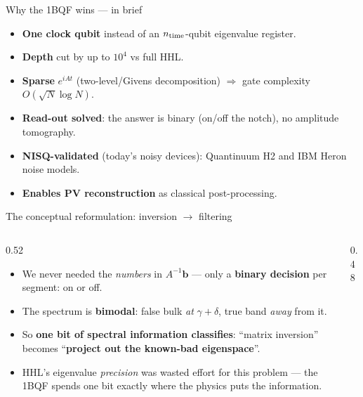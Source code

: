 \begin{frame}{Why the 1BQF wins --- in brief}
  \begin{itemize}
    \item \textbf{One clock qubit} instead of an $n_{\rm time}$-qubit eigenvalue register.
    \item \textbf{Depth} cut by up to $10^4$ vs full HHL.
    \item \textbf{Sparse} $e^{iAt}$ (two-level/Givens decomposition) $\Rightarrow$ gate complexity $O(\sqrt{N}\log N)$.
    \item \textbf{Read-out solved}: the answer is binary (on/off the notch), no amplitude tomography.
    \item \textbf{NISQ-validated} (today's noisy devices): Quantinuum H2 and IBM Heron noise models.
    \item \textbf{Enables PV reconstruction} as classical post-processing.
  \end{itemize}
  \vspace{4pt}
  \centering{}
\end{frame}

\begin{frame}{The conceptual reformulation: inversion $\to$ filtering}
  \begin{columns}[T]
    \begin{column}{0.52\textwidth}
      \begin{itemize}
        \item We never needed the \emph{numbers} in $A^{-1}\mathbf{b}$ --- only a \textbf{binary decision} per segment: on or off.
        \item The spectrum is \textbf{bimodal}: false bulk \emph{at} $\gamma+\delta$, true band \emph{away} from it.
        \item So \textbf{one bit of spectral information classifies}: ``matrix inversion'' becomes ``\textbf{project out the known-bad eigenspace}''.
        \item HHL's eigenvalue \emph{precision} was wasted effort for this problem --- the 1BQF spends one bit exactly where the physics puts the information.
      \end{itemize}
    \end{column}
    \begin{column}{0.48\textwidth}
      \centering{}
    \end{column}
  \end{columns}
\end{frame}

